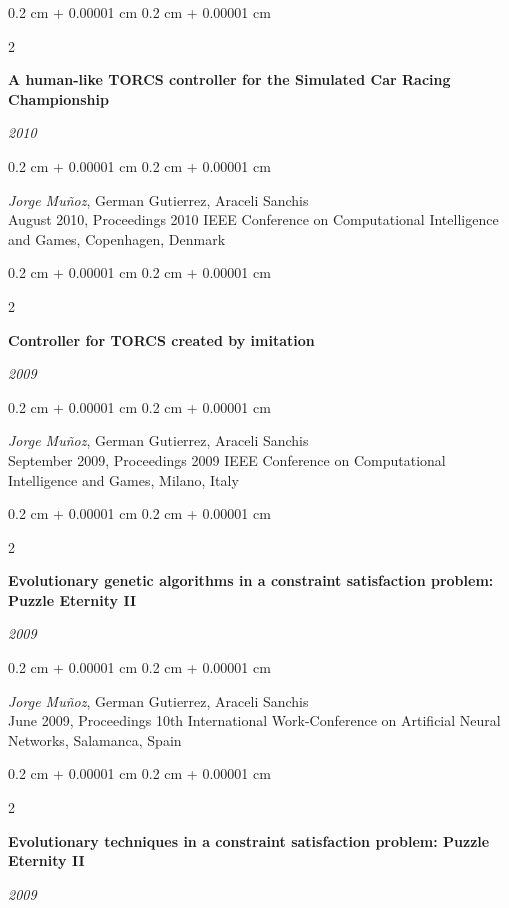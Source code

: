 \documentclass[10pt, letterpaper]{article}
\newenvironment{onecolentry}{
	\begin{adjustwidth}{
		0.2 cm + 0.00001 cm
	}{
		0.2 cm + 0.00001 cm
	}
	}{
	\end{adjustwidth}
} %
\newenvironment{twocolentry}[2][]{
	\onecolentry
	\def\secondColumn{#2}
	\setcolumnwidth{\fill, 5.5 cm}
	\begin{paracol}{2}
	}{
		\switchcolumn \raggedleft \secondColumn
	\end{paracol}
	\endonecolentry
} %
\begin{document}
	\begin{twocolentry}{
		\textit{2010}}
		\textbf{A human-like TORCS controller for the Simulated Car Racing Championship}
	\end{twocolentry}

	\vspace{0.10 cm}
	\begin{onecolentry}
		\textit{Jorge Muñoz}, German Gutierrez, Araceli Sanchis\\
		August 2010, Proceedings 2010 IEEE Conference on Computational Intelligence and Games, Copenhagen, Denmark
	\end{onecolentry}

	\vspace{0.2 cm}

	\begin{twocolentry}{
		\textit{2009}}
		\textbf{Controller for TORCS created by imitation}
	\end{twocolentry}

	\vspace{0.10 cm}
	\begin{onecolentry}
		\textit{Jorge Muñoz}, German Gutierrez, Araceli Sanchis\\
		September 2009, Proceedings 2009 IEEE Conference on Computational Intelligence and Games, Milano, Italy
	\end{onecolentry}

	\vspace{0.10 cm}

	\begin{twocolentry}{
		\textit{2009}}
		\textbf{Evolutionary genetic algorithms in a constraint satisfaction problem: Puzzle Eternity II}
	\end{twocolentry}

	\vspace{0.10 cm}
	\begin{onecolentry}
		\textit{Jorge Muñoz}, German Gutierrez, Araceli Sanchis\\
		June 2009, Proceedings 10th International Work-Conference on Artificial Neural Networks, Salamanca, Spain
	\end{onecolentry}

	\vspace{0.10 cm}

	\begin{twocolentry}{
		\textit{2009}}
		\textbf{Evolutionary techniques in a constraint satisfaction problem: Puzzle Eternity II}
	\end{twocolentry}
\end{document}
